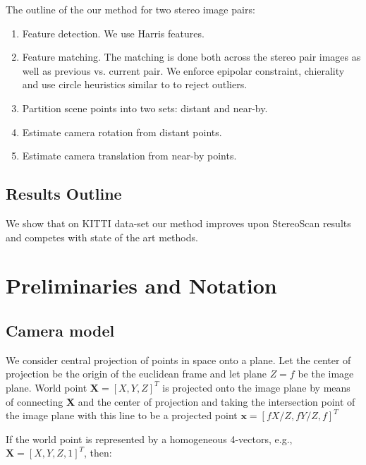 \documentclass[runningheads]{llncs}
\begin{document}
The outline of the our method for two stereo image pairs:
\begin{enumerate}
\item Feature detection.  We use Harris \cite{Harris1987} features.
\item Feature matching. The matching is done both across the stereo
  pair images as well as previous vs. current pair.  We enforce
  epipolar constraint, chierality and use circle heuristics similar to
  \cite{Geiger2011} to reject outliers.
\item Partition scene points into two sets: distant and near-by.
\item Estimate camera rotation from distant points.
\item Estimate camera translation from near-by points.
\end{enumerate}

\subsection{Results Outline}

We show that on KITTI data-set our method improves upon StereoScan\cite{Geiger2011}
results and competes with state of the art methods.

\section{Preliminaries and Notation}

\subsection{Camera model}

We consider central projection of points in space onto a plane. Let
the center of projection be the origin of the euclidean frame and let
plane $Z=f$ be the image plane. World point $\mathbf{X}=[X,Y,Z]^T$ is
projected onto the image plane by means of connecting $\mathbf{X}$ and
the center of projection and taking the intersection point of the
image plane with this line to be a projected point
$\mathbf{x}=[fX/Z,fY/Z,f]^T$


If the world point is represented by a homogeneous 4-vectors, e.g.,
$\mathbf{X} = [X,Y,Z,1]^T$, then:
\end{document}
